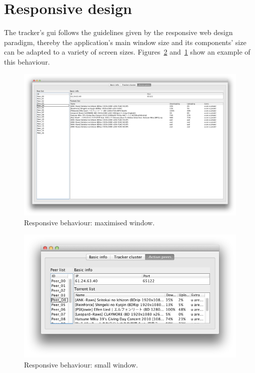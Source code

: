 \documentclass[twoside,a4paper,10pt]{article}
\begin{document}
\section{Responsive design}

The tracker's gui follows the guidelines given by the responsive web design
paradigm, thereby the application's main window size and its components' size
can be adapted to a variety of screen sizes.
Figures~\ref{fig:resp-small} and~\ref{fig:resp-maxi} show an example of this
behaviour.

\begin{figure}[h]
  \centering
  \includegraphics[width=\textwidth]{imgs/responsive_design_maximized.png}
  \caption{\label{fig:resp-maxi}Responsive behaviour: maximised window.}
\end{figure}

\begin{figure}[h]
  \centering
  \includegraphics[width=\textwidth]{imgs/responsive_design.png}
  \caption{\label{fig:resp-small}Responsive behaviour: small window.}
\end{figure}
\end{document}
